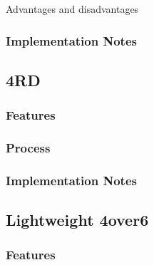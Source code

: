 \documentclass[iwp,first]{luthesis}
\begin{document}
Advantages and disadvantages
\subsubsection {Implementation Notes}




























\subsection{4RD}

\subsubsection {Features}

\subsubsection {Process}

\subsubsection {Implementation Notes}

























\subsection{Lightweight 4over6}

\subsubsection {Features}
\end{document}
